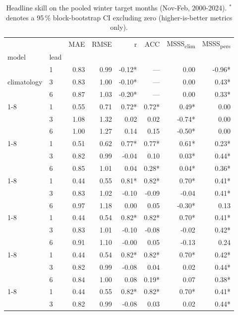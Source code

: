 \begin{table}
\caption{Headline skill on the pooled winter target months (Nov-Feb, 2000-2024). $^*$ denotes a 95\,\% block-bootstrap CI excluding zero (higher-is-better metrics only).}
\label{tab:headline_skill}
\begin{tabular}{llrrrrrr}
\toprule
 &  & MAE & RMSE & r & ACC & MSSS\textsubscript{clim} & MSSS\textsubscript{pers} \\
model & lead &  &  &  &  &  &  \\
\midrule
\multirow[t]{3}{*}{climatology} & 1 & 0.83 & 0.99 & -0.12* & --- & 0.00 & -0.96* \\
 & 3 & 0.83 & 1.00 & -0.10* & --- & 0.00 & 0.43* \\
 & 6 & 0.87 & 1.03 & -0.20* & --- & 0.00 & 0.33* \\
\cline{1-8}
\multirow[t]{3}{*}{persistence} & 1 & 0.55 & 0.71 & 0.72* & 0.72* & 0.49* & 0.00 \\
 & 3 & 1.08 & 1.32 & 0.02 & 0.02 & -0.74* & 0.00 \\
 & 6 & 1.00 & 1.27 & 0.14 & 0.15 & -0.50* & 0.00 \\
\cline{1-8}
\multirow[t]{3}{*}{ar} & 1 & 0.51 & 0.62 & 0.77* & 0.77* & 0.61* & 0.23* \\
 & 3 & 0.82 & 0.99 & -0.04 & 0.10 & 0.03* & 0.44* \\
 & 6 & 0.85 & 1.01 & 0.04 & 0.28* & 0.04* & 0.36* \\
\cline{1-8}
\multirow[t]{3}{*}{ols} & 1 & 0.44 & 0.55 & 0.81* & 0.82* & 0.70* & 0.41* \\
 & 3 & 0.83 & 1.02 & -0.10 & -0.09 & -0.04 & 0.41* \\
 & 6 & 0.97 & 1.18 & 0.00 & 0.05 & -0.30* & 0.13 \\
\cline{1-8}
\multirow[t]{3}{*}{ridge} & 1 & 0.44 & 0.54 & 0.82* & 0.82* & 0.70* & 0.41* \\
 & 3 & 0.83 & 1.01 & -0.10 & -0.08 & -0.02 & 0.42* \\
 & 6 & 0.91 & 1.10 & -0.00 & 0.05 & -0.13 & 0.24 \\
\cline{1-8}
\multirow[t]{3}{*}{lasso} & 1 & 0.44 & 0.54 & 0.82* & 0.82* & 0.70* & 0.42* \\
 & 3 & 0.82 & 0.99 & -0.08 & 0.04 & 0.02 & 0.44* \\
 & 6 & 0.84 & 1.00 & 0.08 & 0.19* & 0.07 & 0.38* \\
\cline{1-8}
\multirow[t]{3}{*}{elasticnet} & 1 & 0.44 & 0.55 & 0.82* & 0.82* & 0.70* & 0.41* \\
 & 3 & 0.82 & 0.99 & -0.08 & 0.03 & 0.02 & 0.44* \\

\end{tabular}
\end{table}
